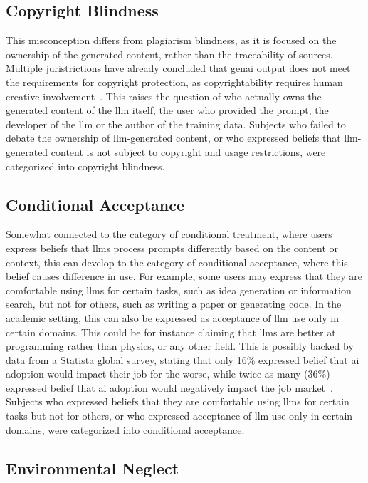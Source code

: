 \subsection{Copyright Blindness}\label{copyblind}
This misconception differs from plagiarism blindness, as it is focused on the ownership of the generated content, rather than the traceability of sources. Multiple juristrictions have already concluded that \gls{genai} output does not meet the requirements for copyright protection, as copyrightability requires human creative involvement\ \cite{dlapiper_genai_copyright_2025,lundqvist_ai_creativity_2025}. This raises the question of who actually owns the generated content of the \gls{llm} itself, the user who provided the prompt, the developer of the \gls{llm} or the author of the training data. Subjects who failed to debate the ownership of \gls{llm}-generated content, or who expressed beliefs that \gls{llm}-generated content is not subject to copyright and usage restrictions, were categorized into copyright blindness.

\subsection{Conditional Acceptance}\label{condacc}
Somewhat connected to the category of \hyperref[condtreat]{conditional treatment}, where users express beliefs that \gls{llms} process prompts differently based on the content or context, this can develop to the category of conditional acceptance, where this belief causes difference in use. For example, some users may express that they are comfortable using \gls{llms} for certain tasks, such as idea generation or information search, but not for others, such as writing a paper or generating code. In the academic setting, this can also be expressed as acceptance of \gls{llm} use only in certain domains. This could be for instance claiming that \gls{llms} are better at programming rather than physics, or any other field. This is possibly backed by data from a Statista global survey, stating that only 16\% expressed belief that \gls{ai} adoption would impact their job for the worse, while twice as many (36\%) expressed belief that \gls{ai} adoption would negatively impact the job market\ \cite{chhibber_will_2025}. 
Subjects who expressed beliefs that they are comfortable using \gls{llms} for certain tasks but not for others, or who expressed acceptance of \gls{llm} use only in certain domains, were categorized into conditional acceptance.
\subsection{Environmental Neglect}\label{envnegl}

